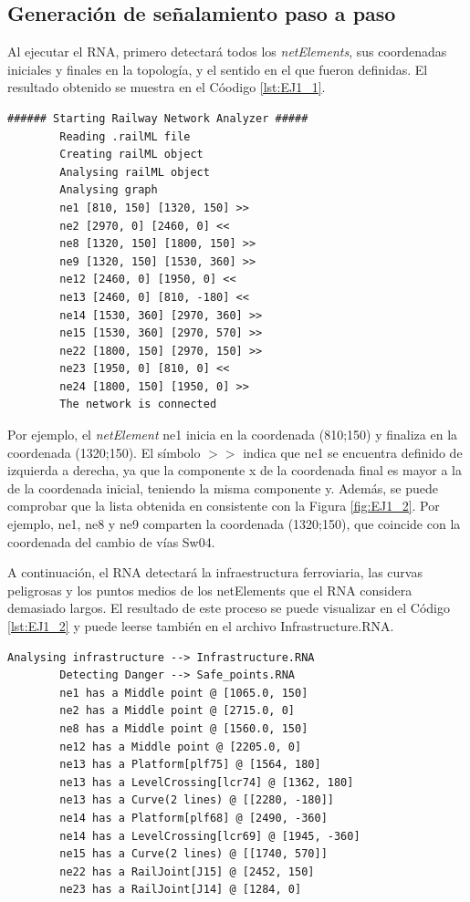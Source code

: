 \subsection{Generación de señalamiento paso a paso}

	Al ejecutar el RNA, primero detectará todos los \textit{netElements}, sus coordenadas iniciales y finales en la topología, y el sentido en el que fueron definidas. El resultado obtenido se muestra en el Cóodigo \ref{lst:EJ1_1}.
	
	\begin{lstlisting}[language = {}, caption = Detección de \textit{netElements} por parte del RNA , label = {lst:EJ1_1}]
		###### Starting Railway Network Analyzer #####
		Reading .railML file
		Creating railML object
		Analysing railML object
		Analysing graph
		ne1 [810, 150] [1320, 150] >>
		ne2 [2970, 0] [2460, 0] <<
		ne8 [1320, 150] [1800, 150] >>
		ne9 [1320, 150] [1530, 360] >>
		ne12 [2460, 0] [1950, 0] <<
		ne13 [2460, 0] [810, -180] <<
		ne14 [1530, 360] [2970, 360] >>
		ne15 [1530, 360] [2970, 570] >>
		ne22 [1800, 150] [2970, 150] >>
		ne23 [1950, 0] [810, 0] <<
		ne24 [1800, 150] [1950, 0] >>
		The network is connected
	\end{lstlisting}
	
	Por ejemplo, el \textit{netElement} ne1 inicia en la coordenada (810;150) y finaliza en la coordenada (1320;150). El símbolo $>>$ indica que ne1 se encuentra definido de izquierda a derecha, ya que la componente x de la coordenada final es mayor a la de la coordenada inicial, teniendo la misma componente y. Además, se puede comprobar que la lista obtenida en consistente con la Figura \ref{fig:EJ1_2}. Por ejemplo, ne1, ne8 y ne9 comparten la coordenada (1320;150), que coincide con la coordenada del cambio de vías Sw04.
	
	A continuación, el RNA detectará la infraestructura ferroviaria, las curvas peligrosas y los puntos medios de los netElements que el RNA considera demasiado largos. El resultado de este proceso se puede visualizar en el Código \ref{lst:EJ1_2} y puede leerse también en el archivo Infrastructure.RNA.
	
	\begin{lstlisting}[language = {}, caption = Detección de puntos críticos por parte del RNA , label = {lst:EJ1_2}]
		Analysing infrastructure --> Infrastructure.RNA
		Detecting Danger --> Safe_points.RNA
		ne1 has a Middle point @ [1065.0, 150]
		ne2 has a Middle point @ [2715.0, 0]
		ne8 has a Middle point @ [1560.0, 150]
		ne12 has a Middle point @ [2205.0, 0]
		ne13 has a Platform[plf75] @ [1564, 180]
		ne13 has a LevelCrossing[lcr74] @ [1362, 180]
		ne13 has a Curve(2 lines) @ [[2280, -180]]
		ne14 has a Platform[plf68] @ [2490, -360]
		ne14 has a LevelCrossing[lcr69] @ [1945, -360]
		ne15 has a Curve(2 lines) @ [[1740, 570]]
		ne22 has a RailJoint[J15] @ [2452, 150]
		ne23 has a RailJoint[J14] @ [1284, 0]
	\end{lstlisting}
	
